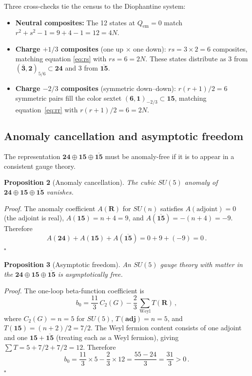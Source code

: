 \documentclass[12pt,a4paper]{article}
\begin{document}
\noindent
Three cross-checks tie the census to the Diophantine system:
\begin{itemize}
\item \textbf{Neutral composites:} The 12 states at $Q_{\text{em}} = 0$
match $r^2 + s^2 - 1 = 9 + 4 - 1 = 12 = 4N$.
\item \textbf{Charge $+1/3$ composites} (one up $\times$ one
down): $rs = 3 \times 2 = 6$ composites, matching equation
\eqref{eq:rs} with $rs = 6 = 2N$.  These states distribute as
3 from $(\bar{\mathbf{3}},\mathbf{2})_{5/6} \subset \mathbf{24}$
and 3 from $\overline{\mathbf{15}}$.
\item \textbf{Charge $-2/3$ composites} (symmetric down--down):
$r(r+1)/2 = 6$ symmetric pairs fill the color sextet
$(\mathbf{6},\mathbf{1})_{-2/3} \subset \mathbf{15}$, matching
equation~\eqref{eq:rr} with $r(r+1)/2 = 6 = 2N$.
\end{itemize}

\subsection{Anomaly cancellation and asymptotic freedom}
The representation $\mathbf{24} \oplus \mathbf{15} \oplus
\overline{\mathbf{15}}$ must be anomaly-free if it is to appear
in a consistent gauge theory.

\medskip
\noindent\textbf{Proposition 2} (Anomaly cancellation).
\textit{The cubic $SU(5)$ anomaly of $\mathbf{24} \oplus
\mathbf{15} \oplus \overline{\mathbf{15}}$ vanishes.}

\medskip
\noindent\textit{Proof.}
The anomaly coefficient $A(\mathbf{R})$ for $SU(n)$ satisfies
$A(\text{adjoint}) = 0$ (the adjoint is real),
$A(\mathbf{15}) = n + 4 = 9$, and
$A(\overline{\mathbf{15}}) = -(n+4) = -9$.  Therefore
\[
A(\mathbf{24}) + A(\mathbf{15}) + A(\overline{\mathbf{15}})
= 0 + 9 + (-9) = 0\,.
\]
\hfill$\square$

\medskip
\noindent\textbf{Proposition 3} (Asymptotic freedom).
\textit{An $SU(5)$ gauge theory with matter in the
$\mathbf{24} \oplus \mathbf{15} \oplus \overline{\mathbf{15}}$
is asymptotically free.}

\medskip
\noindent\textit{Proof.}
The one-loop beta-function coefficient is
\[
b_0 = \frac{11}{3}\,C_2(G) - \frac{2}{3}\,\sum_{\text{Weyl}} T(\mathbf{R})\,,
\]
where $C_2(G) = n = 5$ for $SU(5)$, $T(\mathbf{adj}) = n = 5$,
and $T(\mathbf{15}) = (n+2)/2 = 7/2$.  The Weyl fermion content
consists of one adjoint and one $\mathbf{15} + \overline{\mathbf{15}}$
(treating each as a Weyl fermion), giving
$\sum T = 5 + 7/2 + 7/2 = 12$.  Therefore
\[
b_0 = \frac{11}{3} \times 5 - \frac{2}{3} \times 12
= \frac{55 - 24}{3} = \frac{31}{3} > 0\,.
\]
\hfill$\square$
\end{document}
